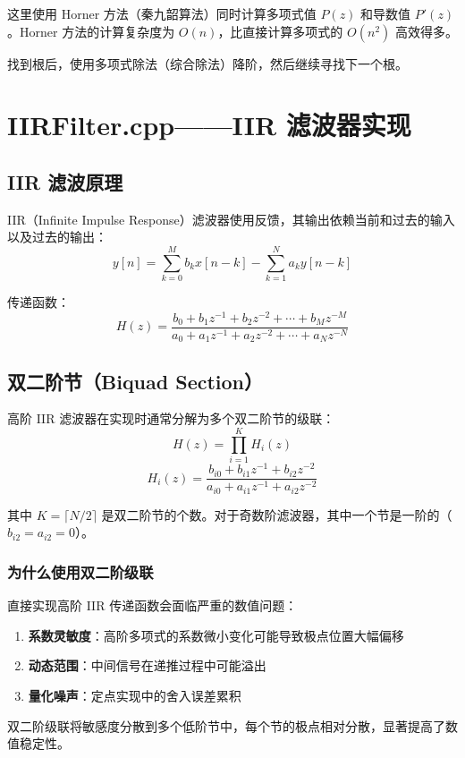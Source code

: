 ﻿\documentclass[12pt,a4paper,oneside]{ctexbook}
\begin{document}
这里使用 Horner 方法（秦九韶算法）同时计算多项式值 \(P(z)\) 和导数值 \(P'(z)\)。Horner 方法的计算复杂度为 \(O(n)\)，比直接计算多项式的 \(O(n^2)\) 高效得多。

找到根后，使用多项式除法（综合除法）降阶，然后继续寻找下一个根。

\section{IIRFilter.cpp——IIR 滤波器实现}

\subsection{IIR 滤波原理}

IIR（Infinite Impulse Response）滤波器使用反馈，其输出依赖当前和过去的输入以及过去的输出：
\[
y[n] = \sum_{k=0}^{M} b_k x[n-k] - \sum_{k=1}^{N} a_k y[n-k]
\]

传递函数：
\[
H(z) = \frac{b_0 + b_1 z^{-1} + b_2 z^{-2} + \cdots + b_M z^{-M}}{a_0 + a_1 z^{-1} + a_2 z^{-2} + \cdots + a_N z^{-N}}
\]

\subsection{双二阶节（Biquad Section）}

高阶 IIR 滤波器在实现时通常分解为多个双二阶节的级联：
\[
H(z) = \prod_{i=1}^{K} H_i(z)
\]
\[
H_i(z) = \frac{b_{i0} + b_{i1} z^{-1} + b_{i2} z^{-2}}{a_{i0} + a_{i1} z^{-1} + a_{i2} z^{-2}}
\]

其中 \(K = \lceil N/2 \rceil\) 是双二阶节的个数。对于奇数阶滤波器，其中一个节是一阶的（\(b_{i2} = a_{i2} = 0\)）。

\subsubsection{为什么使用双二阶级联}

直接实现高阶 IIR 传递函数会面临严重的数值问题：
\begin{enumerate}
    \item \textbf{系数灵敏度}：高阶多项式的系数微小变化可能导致极点位置大幅偏移
    \item \textbf{动态范围}：中间信号在递推过程中可能溢出
    \item \textbf{量化噪声}：定点实现中的舍入误差累积
\end{enumerate}

双二阶级联将敏感度分散到多个低阶节中，每个节的极点相对分散，显著提高了数值稳定性。
\end{document}

